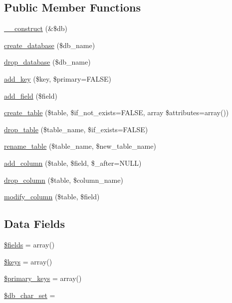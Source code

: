 \subsection*{Public Member Functions}
\begin{DoxyCompactItemize}
\item 
\mbox{\hyperlink{class_c_i___d_b__forge_aaf2ef772755ec6f361d44e16cc9ffd69}{\+\_\+\+\_\+construct}} (\&\$db)
\item 
\mbox{\hyperlink{class_c_i___d_b__forge_a902a7267babceb2ce595706f217e00ad}{create\+\_\+database}} (\$db\+\_\+name)
\item 
\mbox{\hyperlink{class_c_i___d_b__forge_a9612987b2d4230de2638d15857e92e67}{drop\+\_\+database}} (\$db\+\_\+name)
\item 
\mbox{\hyperlink{class_c_i___d_b__forge_a70e5c5fca213d8ad84cc71ba1698c3dd}{add\+\_\+key}} (\$key, \$primary=F\+A\+L\+SE)
\item 
\mbox{\hyperlink{class_c_i___d_b__forge_acdaeff5aae80d6128c7ed9817ee82f1c}{add\+\_\+field}} (\$field)
\item 
\mbox{\hyperlink{class_c_i___d_b__forge_a0904375ba759fbe7961b424a46c0adae}{create\+\_\+table}} (\$table, \$if\+\_\+not\+\_\+exists=F\+A\+L\+SE, array \$attributes=array())
\item 
\mbox{\hyperlink{class_c_i___d_b__forge_ac46bdab43413dcc115d1be4a05dbcd0f}{drop\+\_\+table}} (\$table\+\_\+name, \$if\+\_\+exists=F\+A\+L\+SE)
\item 
\mbox{\hyperlink{class_c_i___d_b__forge_a0fb4802acad335ebdecd921d59de9a51}{rename\+\_\+table}} (\$table\+\_\+name, \$new\+\_\+table\+\_\+name)
\item 
\mbox{\hyperlink{class_c_i___d_b__forge_a855261dcf98c0cf401aa469994919c51}{add\+\_\+column}} (\$table, \$field, \$\+\_\+after=N\+U\+LL)
\item 
\mbox{\hyperlink{class_c_i___d_b__forge_aed0d6a0b12511dbdf19bb68fed7fd467}{drop\+\_\+column}} (\$table, \$column\+\_\+name)
\item 
\mbox{\hyperlink{class_c_i___d_b__forge_aa03cc8de0ac9ce03016bd2b50ddeff87}{modify\+\_\+column}} (\$table, \$field)
\end{DoxyCompactItemize}
\subsection*{Data Fields}
\begin{DoxyCompactItemize}
\item 
\mbox{\hyperlink{class_c_i___d_b__forge_ab2303c817e3b402b77b7f99627b9c319}{\$fields}} = array()
\item 
\mbox{\hyperlink{class_c_i___d_b__forge_af20635b6c08e03bfee9e3fc036fa80f3}{\$keys}} = array()
\item 
\mbox{\hyperlink{class_c_i___d_b__forge_a09349689030ba7198a094abf357c78bc}{\$primary\+\_\+keys}} = array()
\item 
\mbox{\hyperlink{class_c_i___d_b__forge_a6e90c3633cd0984a7e8de501f7771c53}{\$db\+\_\+char\+\_\+set}} = \textquotesingle{}\textquotesingle{}
\end{DoxyCompactItemize}
